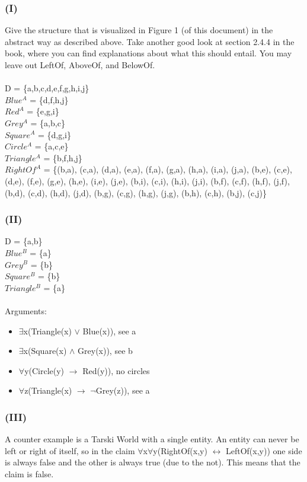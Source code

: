 \documentclass[a4paper]{article}
\begin{document}
\subsubsection{(I)}
Give the structure that is visualized in Figure 1 (of this document) in the abstract way
as described above. Take another good look at section 2.4.4 in the book, where you can find
explanations about what this should entail. You may leave out LeftOf, AboveOf, and BelowOf.
\\\\
D = \{a,b,c,d,e,f,g,h,i,j\}\\
$Blue^A$ = \{d,f,h,j\}\\
$Red^A$ = \{e,g,i\}\\
$Grey^A$ = \{a,b,c\}\\
$Square^A$ = \{d,g,i\}\\
$Circle^A$ = \{a,c,e\}\\
$Triangle^A$ = \{b,f,h,j\}\\
$RightOf^A$ = \{(b,a), (c,a), (d,a), (e,a), (f,a), (g,a), (h,a), (i,a), (j,a), (b,e), (c,e), (d,e), (f,e), (g,e), (h,e), (i,e), (j,e), (b,i), (c,i), (h,i), (j,i), (b,f), (c,f), (h,f), (j,f), (b,d), (c,d), (h,d), (j,d), (b,g), (c,g), (h,g), (j,g), (b,h), (c,h), (b,j), (c,j)\}
\subsubsection{(II)}
D = \{a,b\}\\
$Blue^B$ = \{a\}\\
$Grey^B$ = \{b\}\\
$Square^B$ = \{b\}\\
$Triangle^B$ = \{a\}
\\\\
Arguments:
\begin{itemize}
    \item $\exists $x(Triangle(x) $\vee $ Blue(x)), see a
    \item $\exists $x(Square(x) $\wedge $ Grey(x)), see b
    \item $\forall $y(Circle(y) $\rightarrow $ Red(y)), no circles
    \item $\forall $z(Triangle(x) $\rightarrow $ $\neg $Grey(z)), see a
\end{itemize}
\subsubsection{(III)}
A counter example is a Tarski World with a single entity. An entity can never be left or right of itself, so in the claim $\forall $x$\forall $y(RightOf(x,y) $\leftrightarrow $ LeftOf(x,y)) one side is always false and the other is always true (due to the not). This means that the claim is false.
\end{document}

